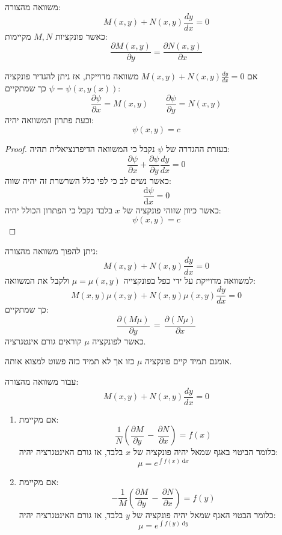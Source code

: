 \documentclass{tstextbook}
\begin{document}
\begin{definition}
משוואה מהצורה:
$$M\left(x,y\right)+N\left(x,y\right){\frac{d y}{d x}}=0$$
כאשר פונקציות \(M,N\) מקיימות:
$$\frac{\partial M(x,y)}{\partial y} =\frac{\partial N(x,y)}{\partial x} $$

\end{definition}
\begin{proposition}
אם \(M\left(x,y\right)+N\left(x,y\right){\frac{d y}{d x}}=0\) משוואה מדוייקת, אז ניתן להגדיר פונקציה \(\psi=\psi(x,y(x))\) כך שמתקיים:
$$\frac{\partial \psi}{\partial x} =M(x,y)\qquad \frac{\partial \psi}{\partial y} =N(x,y)$$
וכעת פתרון המשוואה יהיה:
$$\psi(x,y)=c$$

\end{proposition}
\begin{proof}
בעזרת ההגדרה של \(\psi\) נקבל כי המשוואה הדיפרנציאלית תהיה:
$$\frac{\partial \psi}{\partial x} +\frac{\partial \psi}{\partial y} \frac{dy}{dx}=0$$
כאשר נשים לב כי לפי כלל השרשרת זה יהיה שווה:
$$\frac{\mathrm{d} \psi}{\mathrm{d} x} =0$$
כאשר כיוון שזוהי פונקציה של \(x\) בלבד נקבל כי הפתרון הכולל יהיה:
$$\psi(x,y)=c$$

\end{proof}
\begin{proposition}
ניתן להפוך משוואה מהצורה:
$$M\left(x,y\right)+N\left(x,y\right){\frac{d y}{d x}}=0$$
למשוואה מדוייקת על ידי כפל בפונקצייה \(\mu=\mu(x,y)\) ולקבל את המשוואה:
$$M\left(x,y\right)\mu(x,y)+N\left(x,y\right)\mu(x,y){\frac{d y}{d x}}=0$$
כך שמתקיים:
$$\frac{\partial(M\mu)}{\partial y}\,=\,\frac{\partial(N\mu)}{\partial x}$$
כאשר לפונקציה \(\mu\) קוראים גורם אינטגרציה.

\end{proposition}
\begin{remark}
אומנם תמיד קיים פונקציה \(\mu\) כזו אך לא תמיד כזה פשוט למצוא אותה.

\end{remark}
\begin{proposition}
עבור משוואה מהצורה:
$$M\left(x,y\right)+N\left(x,y\right){\frac{d y}{d x}}=0$$

  \begin{enumerate}
    \item אם מקיימת: 
$${\frac{1}{N}}\left({\frac{\partial M}{\partial y}}\,-\,{\frac{\partial N}{\partial x}}\right)=f(x)$$
כלומר הביטוי באגף שמאל יהיה פונקציה של \(x\) בלבד, אז גורם האינטגרציה יהיה:
$$\mu=e^{\int f(x)\;\mathrm{d}x}$$


    \item אם מקיימת: 
$$-{\frac{1}{M}}\left({\frac{\partial M}{\partial y}}\,-\,{\frac{\partial N}{\partial x}}\right)=f(y)$$
כלומר הבטוי האגף שמאל יהיה פונקציה של \(y\) בלבד, אז גורם האינטגרציה יהיה:
$$\mu=e^{ \int f(y)\;\mathrm{d}y }$$


  \end{enumerate}
\end{proposition}
\end{document}
